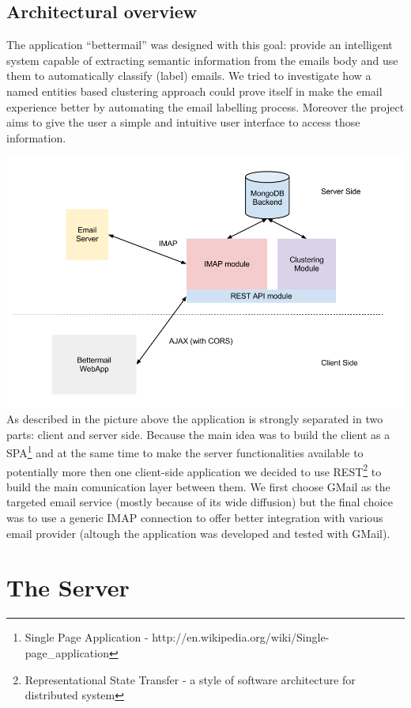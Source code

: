 \documentclass[a4paper,12pt]{report}
\begin{document}
\section{Architectural overview}
The application ``bettermail'' was designed with this goal: provide an intelligent system capable of extracting semantic information from the emails body and use them to automatically classify (label) emails. We tried to investigate how a named entities based clustering approach could prove itself in make the email experience better by automating the email labelling process. Moreover the project aims to give the user a simple and intuitive user interface to access those information.

\includegraphics[width=15cm]{Architecture_Overview}
As described in the picture above the application is strongly separated in two parts: client and server side. Because the main idea was to build the client as a SPA\footnote{Single Page Application - http://en.wikipedia.org/wiki/Single-page\_application} and at the same time to make the server functionalities available to potentially more then one client-side application we decided to use REST\footnote{Representational State Transfer - a style of software architecture for distributed system} to build the main comunication layer between them. 
We first choose GMail as the targeted email service (mostly because of its wide diffusion) but the final choice was to use a generic IMAP connection to offer better integration with various email provider (altough the application was developed and tested with GMail).
\chapter{The Server}
\end{document}
